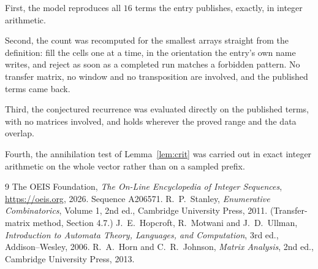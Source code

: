 \documentclass[11pt,a4paper]{article}
\theoremstyle{plain}
\theoremstyle{definition}
\begin{document}
First, the model reproduces all $16$ terms the entry publishes, exactly, in integer
arithmetic.

Second, the count was recomputed for the smallest arrays straight from the definition: fill the
cells one at a time, in the orientation the entry's own name writes, and reject as soon as a
completed run matches a forbidden pattern. No transfer matrix, no window and no transposition
are involved, and the published terms came back.

Third, the conjectured recurrence was evaluated directly on the published terms, with no
matrices involved, and holds wherever the proved range and the data overlap.

Fourth, the annihilation test of Lemma~\ref{lem:crit} was carried out in exact integer
arithmetic on the whole vector rather than on a sampled prefix.

\begin{thebibliography}{9}
 The OEIS Foundation, \emph{The On-Line Encyclopedia of Integer
Sequences}, \url{https://oeis.org}, 2026. Sequence A206571.
 R.~P.~Stanley, \emph{Enumerative Combinatorics}, Volume 1, 2nd ed.,
Cambridge University Press, 2011. (Transfer-matrix method, Section 4.7.)
 J.~E.~Hopcroft, R.~Motwani and J.~D.~Ullman, \emph{Introduction to Automata
Theory, Languages, and Computation}, 3rd ed., Addison--Wesley, 2006.
 R.~A.~Horn and C.~R.~Johnson, \emph{Matrix Analysis}, 2nd ed., Cambridge
University Press, 2013.
\end{thebibliography}
\end{document}
